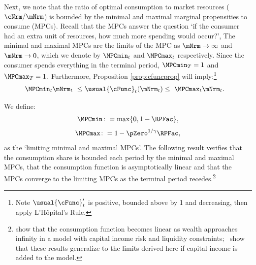 \documentclass[BufferStockTheory]{subfiles}
\begin{document}
Next, we note that the ratio of optimal consumption to market resources ($\cNrm/\mNrm$) is bounded by the minimal and maximal marginal propensities to consume (MPCs).
Recall that the MPCs answer the question `if the consumer had an extra unit of resources, how much more spending would occur?', The minimal and maximal MPCs are the limits of the MPC as $\mNrm \rightarrow \infty$ and $\mNrm \rightarrow 0$, which we denote by $\MPCmin_{t}$ and $\MPCmax_{t}$ respectively.
Since the consumer spends everything in the terminal period, $\MPCmin_{T}=1$ and $\MPCmax_{T}=1$.
Furthermore, Proposition \ref{prop:cfuncprop} will imply:\footnote{Note $\usual{\cFunc}_{t}^{\prime}$ is positive, bounded above by 1 and decreasing, then apply L'H\^{o}pital's Rule.}
%
\begin{equation}\begin{gathered}\begin{aligned}\label{eq:cBounds}
  \MPCmin_{t} \mNrm_{t} ~ \leq & ~  \usual{\cFunc}_{t}(\mNrm_{t})  \leq  ~ \MPCmax_{t} \mNrm_{t} .
\end{aligned}\end{gathered}\end{equation} 


We define:
%
\hypertarget{MPCmaxDefn}{}\hypertarget{MPCminDefn}{}
\begin{equation}
\MPCmin \colon = \max\{0,1- \RPFac\}, \label{eq:MPCminDefn}
\end{equation}
\begin{equation}
\MPCmax \colon = 1 - \pZero^{1/\gamma}\RPFac, \label{eq:MPCmaxDefn}
\end{equation}
as the `limiting minimal and maximal MPCs'.
The following result verifies that the consumption share is bounded each period by the minimal and maximal MPCs, that the consumption function is asymptotically linear and that the MPCs converge to the limiting MPCs as the terminal period recedes.\footnote{\cite{benhabibWealth} show that the consumption function becomes linear as wealth approaches infinity in a model with capital income risk and liquidity constraints;~\cite{maTodaRich} show that these results generalize to the limits derived here if capital income is added to the model.} 
\hypertarget{cFuncBounds}{}
\end{document}
